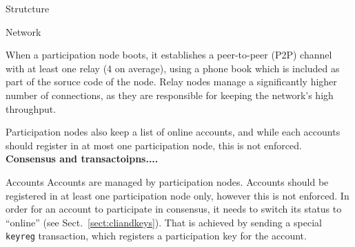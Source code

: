 \documentclass[10pt,a4paper]{article}
\begin{document}
\begin{section}{Strutcture}
\begin{subsection}{Network}

When a participation node boots, it establishes a peer-to-peer (P2P) 
channel with at least one relay (4 on average), using a phone book which is included
as part of the soruce code of the node. 
Relay nodes manage a significantly higher number of connections, as they 
are responsible for keeping the network's high throughput.

Participation nodes also keep a list of online accounts, and while each accounts should
register in at most one participation node, this is not enforced.
{\bf Consensus and transactoipns....}


\end{subsection}
\begin{subsection}{Accounts}\label{sect:accounts}
    Accounts are managed by participation nodes. Accounts should be registered in at least one participation
    node only, however this is not enforced.
    In order for an account to participate in consensus, it needs to switch its status to ``online''
    (see Sect.~\ref{sect:cliandkeys}). 
    That is achieved by sending a special {\tt keyreg} transaction,
    which registers a participation key for the account.%
    

\end{subsection}
\end{section}
\end{document}
